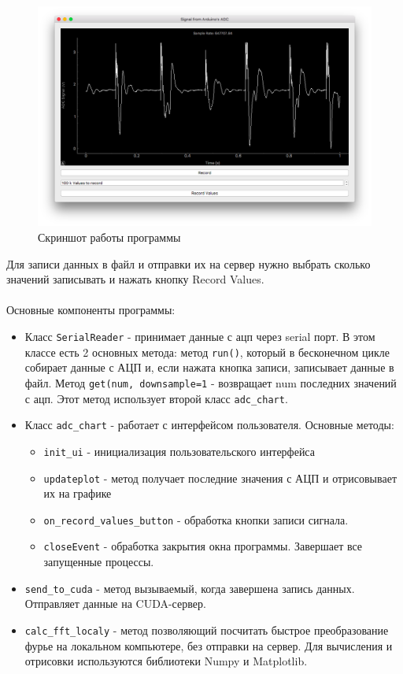 \documentclass[../paper.tex]{subfiles}
\begin{document}
\begin{figure}[H]
\centering
\includegraphics[width=\textwidth]{images/app-screen.png}
\caption{Скриншот работы программы}
\end{figure}

Для записи данных в файл и отправки их на сервер нужно выбрать сколько значений записывать и нажать кнопку Record Values.\\\\


Основные компоненты программы:
\begin{itemize}
  \item Класс \verb|SerialReader| - принимает данные с ацп через serial порт. В этом классе есть 2 основных метода: метод \verb|run()|, который в бесконечном цикле собирает данные с АЦП и, если нажата кнопка записи, записывает данные в файл. Метод \verb|get(num, downsample=1| - возвращает num последних значений с ацп. Этот метод использует второй класс \verb|adc_chart|.
  \item Класс \verb|adc_chart| - работает с интерфейсом пользователя. Основные методы: 
    \begin{itemize}
      \item \verb|init_ui| - инициализация пользовательского интерфейса
      \item \verb|updateplot| - метод получает последние значения с АЦП и отрисовывает их на графике
      \item \verb|on_record_values_button| - обработка кнопки записи сигнала.
      \item \verb|closeEvent| - обработка закрытия окна программы. Завершает все запущенные процессы.
    \end{itemize}
  \item \verb|send_to_cuda| - метод вызываемый, когда завершена запись данных. Отправляет данные на CUDA-сервер.
  \item \verb|calc_fft_localy| - метод позволяющий посчитать быстрое преобразование фурье на локальном компьютере, без отправки на сервер. Для вычисления и отрисовки используются библиотеки Numpy и Matplotlib.
\end{itemize}
\end{document}
